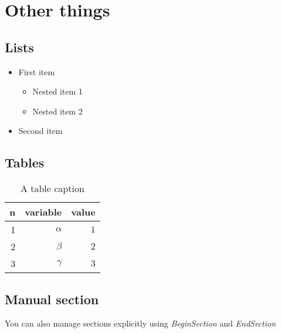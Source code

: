 \documentclass{article}
\begin{document}
\section{Other things}
\subsection{Lists}
\begin{itemize}
    \item First item\begin{itemize}
              \item Nested item 1\item Nested item 2
          \end{itemize}
    \item Second item
\end{itemize}
\subsection{Tables}
\begin{table}[h]
    \centering
    \begin{tabular}{r|r|r}
        \toprule
        n & variable & value \\
        \midrule
        1 & $\alpha$ & $1$   \\
        2 & $\beta$  & $2$   \\
        3 & $\gamma$ & $3$   \\
        \bottomrule
    \end{tabular}
    \caption*{A table caption}
    \label{table}
\end{table}
\subsection{Manual section}
You can also manage sections explicitly using \emph{BeginSection} and \emph{EndSection}
\end{document}
